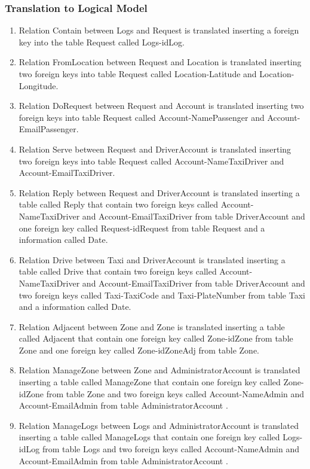 \documentclass[11pt, a4paper,titlepage]{article}
\begin{document}
\subsubsection{Translation to Logical Model}	
\begin{enumerate}
	\item Relation Contain between Logs and Request is translated inserting a foreign key into the table Request called Logs-idLog.
	\item  Relation FromLocation between Request and Location is translated inserting two foreign keys into table Request called Location-Latitude and Location-Longitude.
	\item  Relation DoRequest between Request and Account is translated inserting two foreign keys into table Request called Account-NamePassenger and Account-EmailPassenger.
	\item  Relation Serve between Request and DriverAccount is translated inserting two foreign keys into table Request called Account-NameTaxiDriver and Account-EmailTaxiDriver.
	\item  Relation Reply between Request and DriverAccount is translated inserting a table called Reply that contain two foreign keys called Account-NameTaxiDriver and Account-EmailTaxiDriver from table DriverAccount and one foreign key called Request-idRequest from table Request and a information called Date.
	\item  Relation Drive between Taxi and DriverAccount is translated inserting a table called Drive that contain two foreign keys called Account-NameTaxiDriver and Account-EmailTaxiDriver from table DriverAccount and two foreign keys called Taxi-TaxiCode and Taxi-PlateNumber from table Taxi and a information called Date.
	\item  Relation Adjacent between Zone and Zone is translated inserting a table called Adjacent that contain one foreign key called Zone-idZone from table Zone and one foreign key called Zone-idZoneAdj from table Zone.
	\item  Relation ManageZone between Zone and AdministratorAccount is translated inserting a table called ManageZone that contain one foreign key called Zone-idZone from table Zone and two foreign keys called Account-NameAdmin and Account-EmailAdmin from table AdministratorAccount .
	\item  Relation ManageLogs between Logs and AdministratorAccount  is translated inserting a table called ManageLogs that contain one foreign key called Logs-idLog from table Logs and two foreign keys called Account-NameAdmin and Account-EmailAdmin from table AdministratorAccount .

\end{enumerate}
\end{document}
